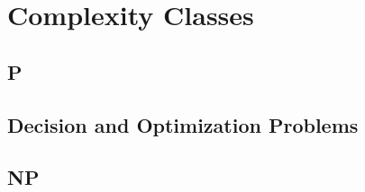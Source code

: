 \chapter{Complexity Classes}

\section{P}

\section{Decision and Optimization Problems}

\section{NP}

